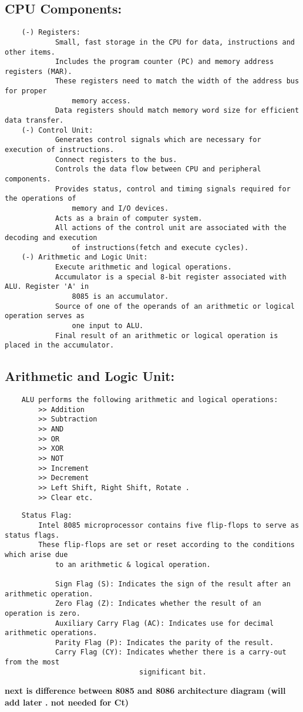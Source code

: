 \documentclass{article}
\begin{document}
\subsection*{CPU Components:}
\begin{verbatim}
    (-) Registers:
            Small, fast storage in the CPU for data, instructions and other items.
            Includes the program counter (PC) and memory address registers (MAR).
            These registers need to match the width of the address bus for proper 
                memory access.
            Data registers should match memory word size for efficient data transfer.
    (-) Control Unit:
            Generates control signals which are necessary for execution of instructions.
            Connect registers to the bus.
            Controls the data flow between CPU and peripheral components.
            Provides status, control and timing signals required for the operations of
                memory and I/O devices.
            Acts as a brain of computer system.
            All actions of the control unit are associated with the decoding and execution
                of instructions(fetch and execute cycles).
    (-) Arithmetic and Logic Unit:
            Execute arithmetic and logical operations.
            Accumulator is a special 8-bit register associated with ALU. Register 'A' in
                8085 is an accumulator.
            Source of one of the operands of an arithmetic or logical operation serves as
                one input to ALU.
            Final result of an arithmetic or logical operation is placed in the accumulator.
\end{verbatim}

\subsection*{Arithmetic and Logic Unit:}
\begin{verbatim}
    ALU performs the following arithmetic and logical operations:
        >> Addition
        >> Subtraction
        >> AND
        >> OR
        >> XOR
        >> NOT
        >> Increment
        >> Decrement
        >> Left Shift, Right Shift, Rotate .
        >> Clear etc.
\end{verbatim}
\newpage

\begin{verbatim}
    Status Flag:
        Intel 8085 microprocessor contains five flip-flops to serve as status flags.
        These flip-flops are set or reset according to the conditions which arise due
            to an arithmetic & logical operation.

            Sign Flag (S): Indicates the sign of the result after an arithmetic operation.
            Zero Flag (Z): Indicates whether the result of an operation is zero.
            Auxiliary Carry Flag (AC): Indicates use for decimal arithmetic operations.
            Parity Flag (P): Indicates the parity of the result.
            Carry Flag (CY): Indicates whether there is a carry-out from the most 
                                significant bit.
\end{verbatim}

\textbf{next is difference between 8085 and 8086 architecture diagram (will add later . not needed for Ct)}
\newpage
\end{document}
